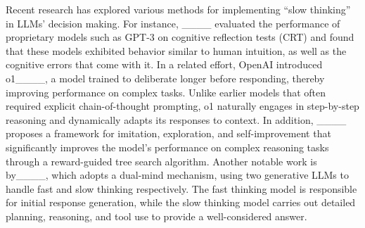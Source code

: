 Recent research has explored various methods for implementing ``slow thinking'' in LLMs' decision making. For instance, ____ evaluated the performance of proprietary models such as GPT-3 on cognitive reflection tests (CRT) and found that these models exhibited behavior similar to human intuition, as well as the cognitive errors that come with it. In a related effort, OpenAI introduced o1____, a model trained to deliberate longer before responding, thereby improving performance on complex tasks. Unlike earlier models that often required explicit chain-of-thought prompting, o1 naturally engages in step-by-step reasoning and dynamically adapts its responses to context. In addition, ____ proposes a framework for imitation, exploration, and self-improvement that significantly improves the model's performance on complex reasoning tasks through a reward-guided tree search algorithm. Another notable work is by____, which adopts a dual-mind mechanism, using two generative LLMs to handle fast and slow thinking respectively. The fast thinking model is responsible for initial response generation, while the slow thinking model carries out detailed planning, reasoning, and tool use to provide a well-considered answer.